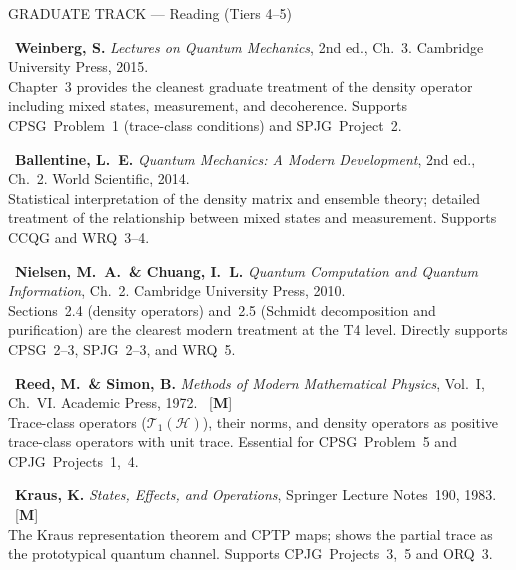 \documentclass[11pt,a4paper]{article}
\begin{document}
\bigskip
\begin{tcolorbox}[trackheaderGRAD]
GRADUATE TRACK --- Reading (Tiers 4--5)
\end{tcolorbox}

\bigskip
\begin{enumerate}[leftmargin=2em,label={\textbf{[\arabic*]}},itemsep=6pt,resume]

  \item {}\
    \textbf{Weinberg, S.}
    \textit{Lectures on Quantum Mechanics}, 2nd ed., Ch.~3.
    Cambridge University Press, 2015. \essential\\
    Chapter~3 provides the cleanest graduate treatment of the density
    operator including mixed states, measurement, and decoherence.
    Supports CPSG~Problem~1 (trace-class conditions) and SPJG~Project~2.

  \item {}\
    \textbf{Ballentine, L.~E.}
    \textit{Quantum Mechanics: A Modern Development}, 2nd ed., Ch.~2.
    World Scientific, 2014. \essential\\
    Statistical interpretation of the density matrix and ensemble theory;
    detailed treatment of the relationship between mixed states and
    measurement. Supports CCQG and WRQ~3--4.

  \item {}\
    \textbf{Nielsen, M.~A.\ \& Chuang, I.~L.}
    \textit{Quantum Computation and Quantum Information}, Ch.~2.
    Cambridge University Press, 2010. \essential\\
    Sections~2.4 (density operators) and~2.5 (Schmidt decomposition
    and purification) are the clearest modern treatment at the T4 level.
    Directly supports CPSG~2--3, SPJG~2--3, and WRQ~5.

  \item \tiertag{tier5col}{T5}\
    \textbf{Reed, M.\ \& Simon, B.}
    \textit{Methods of Modern Mathematical Physics}, Vol.~I, Ch.~VI.
    Academic Press, 1972. \essential\ [\textbf{M}]\\
    Trace-class operators ($\mathcal{T}_1(\mathcal{H})$), their norms,
    and density operators as positive trace-class operators with unit trace.
    Essential for CPSG~Problem~5 and CPJG~Projects~1,~4.

  \item \tiertag{tier5col}{T5}\
    \textbf{Kraus, K.}
    \textit{States, Effects, and Operations}, Springer Lecture Notes~190, 1983.
    \recommended\ [\textbf{M}]\\
    The Kraus representation theorem and CPTP maps; shows the partial trace
    as the prototypical quantum channel. Supports CPJG~Projects~3,~5
    and ORQ~3.


\end{enumerate}
\end{document}

